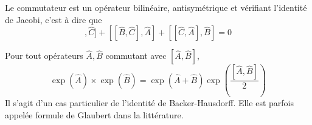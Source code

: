 \documentclass[../Notesdecours.tex]{subfiles}
\begin{document}
\begin{Property}
	Le commutateur est un opérateur bilinéaire, antisymétrique et vérifiant l'identité de Jacobi, c'est à dire que
	\begin{equation}
		[[\hat{A},\hat{B}],\hat{C}] + [[\hat{B},\hat{C}],\hat{A}] + [[\hat{C},\hat{A}],\hat{B}] = 0
	\end{equation}
\end{Property}

\begin{theorem}
	Pour tout opérateurs $\hat{A},\hat{B}$ commutant avec $[\hat{A},\hat{B}]$, 
	\begin{equation}
		\exp\left(\hat{A}\right)\times\exp\left(\hat{B}\right) = \exp\left(\hat{A}+\hat{B}\right)\exp\left(\frac{[\hat{A},\hat{B}]}{2}\right)
	\end{equation}
	Il s'agit d'un cas particulier de l'identité de Backer-Hausdorff. Elle est parfois appelée formule de Glaubert dans la littérature.
\end{theorem}
\end{document}
